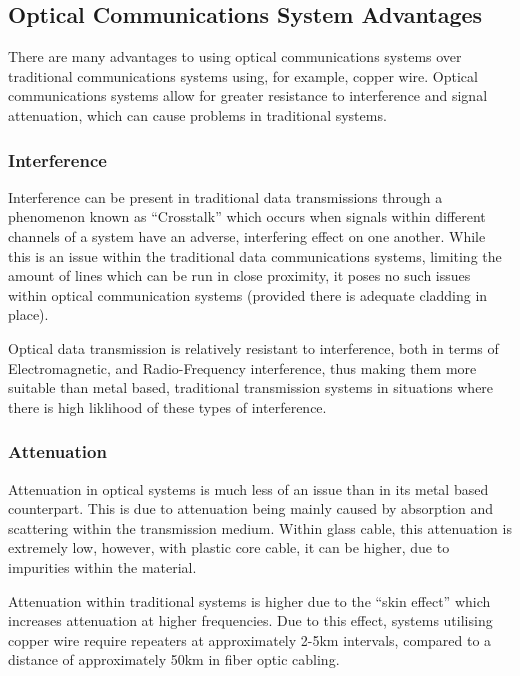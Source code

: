 \subsection{Optical Communications System Advantages}

There are many advantages to using optical communications systems over
traditional communications systems using, for example, copper wire. Optical
communications systems allow for greater resistance to interference and signal
attenuation, which can cause problems in traditional systems.

\subsubsection{Interference}

Interference can be present in traditional data transmissions through a
phenomenon known as ``Crosstalk'' which occurs when signals within different
channels of a system have an adverse, interfering effect on one
another\cite{wikipediacross_2019}. While this is an issue within the traditional
data communications systems, limiting the amount of lines which can be run in
close proximity, it poses no such issues within optical communication systems
(provided there is adequate cladding in place\cite{mickelson_2003}).

\par Optical data transmission is relatively resistant to interference, both in
terms of Electromagnetic, and Radio-Frequency interference, thus making them
more suitable than metal based, traditional transmission systems in situations
where there is high liklihood of these types of interference\cite{alwayn_2004}.

\subsubsection{Attenuation}

Attenuation in optical systems is much less of an issue than in its metal based
counterpart. This is due to attenuation being mainly caused by absorption and
scattering within the transmission medium\cite{alwayn_2004}. Within glass cable,
this attenuation is extremely low, however, with plastic core cable, it can be
higher, due to impurities within the material\cite{alwayn_2004}.

\par Attenuation within traditional systems is higher due to the ``skin effect''
which increases attenuation at higher frequencies\cite{hayt_buck_2019}. Due to
this effect, systems utilising copper wire require repeaters at approximately
2-5km intervals, compared to a distance of approximately 50km in fiber optic
cabling\cite{mickelson_2003}\cite{fiber_vs_wire}.
